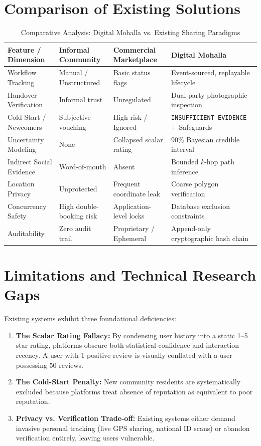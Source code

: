 \section{Comparison of Existing Solutions}
\begin{table}[htbp]
\centering
\caption{Comparative Analysis: Digital Mohalla vs. Existing Sharing Paradigms}
\label{tab:comparative_analysis}
\small
\begin{tabularx}{\textwidth}{l X X X}
\toprule
\textbf{Feature / Dimension} & \textbf{Informal Community} & \textbf{Commercial Marketplace} & \textbf{Digital Mohalla} \\
\midrule
Workflow Tracking & Manual / Unstructured & Basic status flags & Event-sourced, replayable lifecycle \\
Handover Verification & Informal trust & Unregulated & Dual-party photographic inspection \\
Cold-Start / Newcomers & Subjective vouching & High risk / Ignored & \texttt{INSUFFICIENT\_EVIDENCE} + Safeguards \\
Uncertainty Modeling & None & Collapsed scalar rating & 90\% Bayesian credible interval \\
Indirect Social Evidence & Word-of-mouth & Absent & Bounded $k$-hop path inference \\
Location Privacy & Unprotected & Frequent coordinate leak & Coarse polygon verification \\
Concurrency Safety & High double-booking risk & Application-level locks & Database exclusion constraints \\
Auditability & Zero audit trail & Proprietary / Ephemeral & Append-only cryptographic hash chain \\
\bottomrule
\end{tabularx}
\end{table}

\section{Limitations and Technical Research Gaps}
Existing systems exhibit three foundational deficiencies:
\begin{enumerate}
    \item \textbf{The Scalar Rating Fallacy:} By condensing user history into a static 1--5 star rating, platforms obscure both statistical confidence and interaction recency. A user with 1 positive review is visually conflated with a user possessing 50 reviews.
    \item \textbf{The Cold-Start Penalty:} New community residents are systematically excluded because platforms treat absence of reputation as equivalent to poor reputation.
    \item \textbf{Privacy vs. Verification Trade-off:} Existing systems either demand invasive personal tracking (live GPS sharing, national ID scans) or abandon verification entirely, leaving users vulnerable.
\end{enumerate}

